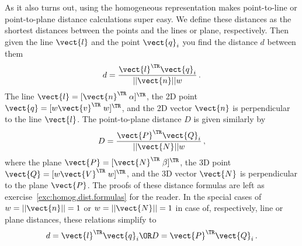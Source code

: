 \documentclass[oneandhalfcolumn]{coursenotes-handout}
\begin{document}
As it also turns out, using the homogeneous representation makes point-to-line or point-to-plane distance calculations super easy. We define these distances as the shortest distances between the points and the lines or plane, respectively. Then given the line \(\vect{l}\) and the point \(\vect{q}_i\) you find the distance \(d\) between them
\begin{align}
d = \frac{\vect{l}^{\TR} \vect{q}_i}{||\vect{n}||w} \,. \label{eq:hom.dist2line}
\end{align}
The line \(\vect{l} = [\vect{n}^{\TR} \; \alpha]^{\TR}\), the 2D point \(\vect{q} = [w \vect{v}^{\TR} \; w]^{\TR}\), and the 2D vector \(\vect{n}\) is perpendicular to the line \(\vect{l}\). The point-to-plane distance \(D\) is given similarly by
\begin{align}
D = \frac{\vect{P}^{\TR} \vect{Q}_i}{||\vect{N}||w} \,, \label{eq:hom.dist2plane}
\end{align}
where the plane \(\vect{P} = [\vect{N}^{\TR} \; \beta]^{\TR}\), the 3D point \(\vect{Q} = [w \vect{V}^{\TR} \; w]^{\TR}\), and the 3D vector \(\vect{N}\) is perpendicular to the plane \(\vect{P}\). The proofs of these distance formulas are left as exercise~\ref{exc:homog.dist.formulas} for the reader. In the special cases of \(w = ||\vect{n}|| = 1\) or \(w = ||\vect{N}|| = 1\) in case of, respectively, line or plane distances, these relations simplify to
\begin{align}
d = \vect{l}^{\TR} \vect{q}_i \OR D = \vect{P}^{\TR} \vect{Q}_i \,.
\end{align}
\end{document}
